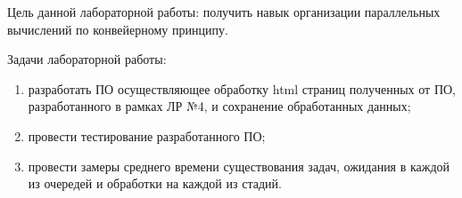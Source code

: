
Цель данной лабораторной работы: получить навык организации параллельных вычислений по конвейерному принципу.

Задачи лабораторной работы:
\begin{enumerate}[label={\arabic*)}]
	\item разработать ПО осуществляющее обработку html страниц полученных от ПО, разработанного в рамках ЛР №4, и сохранение обработанных данных;
	\item провести тестирование разработанного ПО;
	\item провести замеры среднего времени существования задач, ожидания в каждой из очередей и обработки на каждой из стадий.
\end{enumerate}
\clearpage